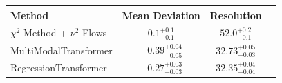     \begin{tabular}{lccc}
        \toprule
        Method & Mean Deviation & Resolution \\
        \midrule
        $\chi^2$-Method + $\nu^2$-Flows & $0.1_{-0.1}^{+0.1}$ & $52.0_{-0.1}^{+0.2}$ \\
        MultiModalTransformer & $-0.39_{-0.05}^{+0.04}$ & $32.73_{-0.03}^{+0.05}$ \\
        RegressionTransformer & $-0.27_{-0.03}^{+0.03}$ & $32.35_{-0.04}^{+0.04}$ \\
        \bottomrule
    \end{tabular}